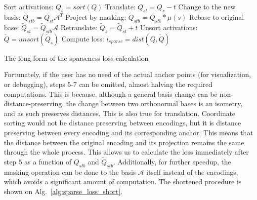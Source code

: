 			\begin{algorithm}[!ht]
				\SetAlgoLined
				\newcommand{\nosemic}{\SetEndCharOfAlgoLine{\relax}}   %
				\newcommand{\dosemic}{\SetEndCharOfAlgoLine{\string;}} %
				\newcommand{\pushline}{\Indp}                          %
				\newcommand{\popline}{\Indm\dosemic}                   %
				\let\oldnl\nl                                          %
				\newcommand{\nonl}{\renewcommand{\nl}{\let\nl\oldnl}}  %
				
				
				\nosemic\nonl \;
				
				\dosemic Sort activations: $Q_s = sort(Q)$\;
				Translate: $Q_{st} = Q_s - t$\;
				Change to the new basis: $Q_{stb} = Q_{st}\mathcal{A}^T$\;
				Project by masking: $\widetilde{Q}_{stb} = Q_{stb} * \mu(s)$\;
				Rebase to original base: $\widetilde{Q}_{st} = \widetilde{Q}_{stb}\mathcal{A}$\;
				Retranslate: $\widetilde{Q}_{s} = \widetilde{Q}_{st} + t$\;
				Unsort activations: $\widetilde{Q} = unsort(\widetilde{Q}_{s})$\;
				Compute loss: $l_{sparse} = dist(Q, \widetilde{Q})$\;
				
				\caption[Long-form sparseness loss in SCA]{The long form of the sparseness loss calculation}
				\label{alg:sparse_loss_long}
			\end{algorithm}
			
			Fortunately, if the user has no need of the actual anchor points (for visualization, or debugging), steps $5$-$7$ can be omitted, almost halving the required computations.
			This is because, although a general basis change can be non-distance-preserving, the change between two orthonormal bases is an isometry, and as such preserves distances.
			This is also true for translation.
			Coordinate sorting would not be distance preserving between encodings, but it is distance preserving between every encoding and its corresponding anchor.
			This means that the distance between the original encoding and its projection remains the same through the whole process.
			This allows us to calculate the loss immediately after step $5$ as a function of $Q_{stb}$ and $\widetilde{Q}_{stb}$.
			Additionally, for further speedup, the masking operation can be done to the basis $\mathcal{A}$ itself instead of the encodings, which avoids a significant amount of computation.
			The shortened procedure is shown on Alg.~\ref{alg:sparse_loss_short}.
			
